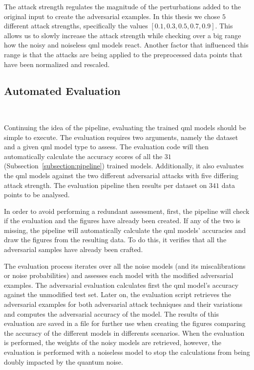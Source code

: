 The attack strength regulates the magnitude of the perturbations
added to the original input to create the adversarial examples. 
In this thesis we chose \(5\) different attack strengths,
specifically the values \(\left[0.1, 0.3, 0.5, 0.7, 0.9\right]\).
This allows us to slowly increase the attack strength while
checking over a big range how the noisy and noiseless \ac{qml}
models react. Another factor that influenced this range is that
the attacks are being applied to the preprocessed data points
that have been normalized and rescaled. \

\subsection{Automated Evaluation}\label{subsection:evaluation} \

Continuing the idea of the pipeline, evaluating the trained
\ac{qml} models should be simple to execute. The evaluation
requires two arguments, namely the dataset and a given \ac{qml}
model type to assess. The evaluation code will then
automatically calculate the accuracy scores of all the \(31\)
(Subsection~\ref{subsection:pipeline}) trained models. Additionally,
it also evaluates the \ac{qml} models against the two different
adversarial attacks with five differing attack strength.
The evaluation pipeline then results per dataset on \(341\)
data points to be analysed. \

In order to avoid performing a redundant assessment, first,
the pipeline will check if the evaluation and the figures
have already been created. If any of the two is missing,
the pipeline will automatically calculate the \ac{qml} models'
accuracies and draw the figures from the resulting data. To
do this, it verifies that all the adversarial samples have
already been crafted. \

The evaluation process iterates over all the noise
models (and its miscalibrations or noise probabilities)
and assesses each model with the modified adversarial
examples. The adversarial evaluation calculates first the
\ac{qml} model's accuracy against the unmodified test set.
Later on, the evaluation script retrieves the adversarial
examples for both adversarial attack techniques and their
variations and computes the adversarial accuracy of the model.
The results of this evaluation are saved in a file
for further use when creating the figures comparing the
accuracy of the different models in differents scenarios.
When the evaluation is performed, the weights of the noisy
models are retrieved, however, the evaluation is performed
with a noiseless model to stop the calculations from being
doubly impacted by the quantum noise. \

